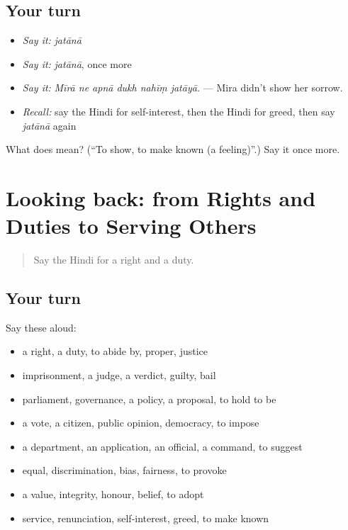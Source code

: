 \subsection*{Your turn}
\begin{itemize}
\raggedright
  \item \emph{Say it:} \emph{jatānā}
  \item \emph{Say it:} \emph{jatānā}, once more
  \item \emph{Say it:} \emph{Mīrā ne apnā dukh nahīṃ jatāyā.} — Mira didn't show her sorrow.
  \item \emph{Recall:} say the Hindi for self-interest, then the Hindi for greed, then say \emph{jatānā} again
\end{itemize}

\begin{tcolorbox}[breakable,colback=teal!4,colframe=teal!35!black,title={Before you move on}]
What does  mean? (\textquotedblleft{}To show, to make known (a feeling)\textquotedblright{}.) Say it once more.
\end{tcolorbox}
\section[(dialogue)]{Looking back: from Rights and Duties to Serving Others}

\label{lesson:HI-R358-review-351-358}



\begin{quote}
Say the Hindi for a right and a duty.
\end{quote}

\subsection*{Your turn}
Say these aloud:

\begin{itemize}
\raggedright
  \item a right, a duty, to abide by, proper, justice
  \item imprisonment, a judge, a verdict, guilty, bail
  \item parliament, governance, a policy, a proposal, to hold to be
  \item a vote, a citizen, public opinion, democracy, to impose
  \item a department, an application, an official, a command, to suggest
  \item equal, discrimination, bias, fairness, to provoke
  \item a value, integrity, honour, belief, to adopt
  \item service, renunciation, self-interest, greed, to make known
\end{itemize}

